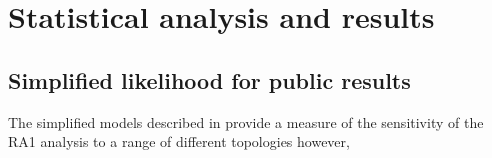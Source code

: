 \chapter{Statistical analysis and results}
\label{chap:statAna}
 \section{Simplified likelihood for public results}

 The simplified models described in  provide a measure of the sensitivity
 of the RA1 analysis to a range of different topologies however,

